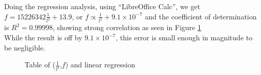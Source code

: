 \documentclass[a4paper,12pt]{article}
\begin{document}
    Doing the regression analysis, using ``LibreOffice Calc'', we get $f=15226342\frac{1}{l^{2}}+13.9$, or $f\propto\frac{1}{l^{2}}+9.1\times10^{-7}$ and the coefficient of determination is $R^{2}=0.99998$, showing strong correlation as seen in Figure \ref{fig:regression}\\
    While the result is off by $9.1\times10^{-7}$, this error is small enough in magnitude to be negligible.
    \begin{figure}[H]%
    \begin{center}

    \caption{Table of ($\frac{1}{l^{2}}$,$f$) and linear regression}\label{fig:regression}
    \end{center}
    \end{figure}
\end{document}
